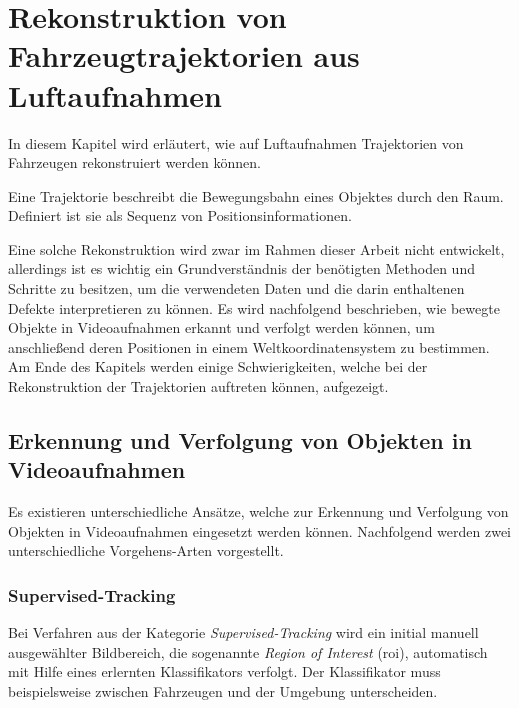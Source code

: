 
\chapter{Rekonstruktion von Fahrzeugtrajektorien aus Luftaufnahmen}
\label{sec:position_extraction}

In diesem Kapitel wird erläutert, wie auf Luftaufnahmen Trajektorien von Fahrzeugen rekonstruiert werden können.

\begin{theorem}[Trajektorie]
    Eine Trajektorie beschreibt die Bewegungsbahn eines Objektes durch den Raum. Definiert ist sie
    als Sequenz von Positionsinformationen.
\end{theorem}

Eine solche Rekonstruktion wird zwar im Rahmen dieser Arbeit nicht entwickelt, allerdings ist es wichtig ein Grundverständnis
der benötigten Methoden und Schritte zu besitzen, um die verwendeten Daten und die darin enthaltenen Defekte
interpretieren zu können.
Es wird nachfolgend beschrieben, wie bewegte Objekte in Videoaufnahmen erkannt und verfolgt
werden können, um anschließend deren Positionen in einem Weltkoordinatensystem zu bestimmen. Am Ende des Kapitels
werden einige Schwierigkeiten, welche bei der Rekonstruktion der Trajektorien auftreten können, aufgezeigt.

\section{Erkennung und Verfolgung von Objekten in Videoaufnahmen}

Es existieren unterschiedliche Ansätze, welche zur Erkennung und Verfolgung von Objekten in Videoaufnahmen eingesetzt werden können.
Nachfolgend werden zwei unterschiedliche Vorgehens-Arten vorgestellt.

\subsection{Supervised-Tracking}

\begin{theorem}
    Bei Verfahren aus der Kategorie \textit{Supervised-Tracking} wird ein initial manuell ausgewählter Bildbereich,
    die sogenannte \textit{Region of Interest} (\acrshort*{roi}),
    automatisch mit Hilfe eines erlernten Klassifikators verfolgt. Der Klassifikator muss beispielsweise zwischen
    Fahrzeugen und der Umgebung unterscheiden.
\end{theorem}

